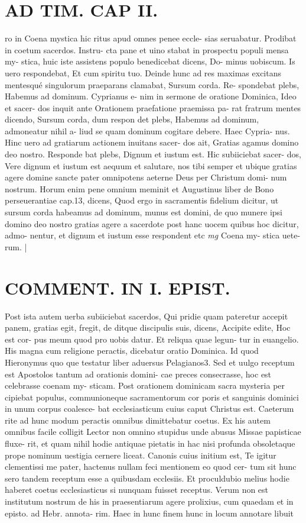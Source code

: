 \documentclass{article}
\begin{document}
\begin{pages}
\section*{AD TIM. CAP II. }
\marginpar{[ p.109 ]}\pstart ro in Coena mystica hic ritus apud omnes penee eccle- sias seruabatur. Prodibat in coetum sacerdos. Instru- cta pane et uino stabat in prospectu populi mensa my- stica, huic iste assistens populo benedicebat dicens, Do- minus uobiscum. Is uero respondebat, Et cum spiritu tuo. Deinde hunc ad res maximas excitans mentesqué singulorum praeparans clamabat, Sursum corda. Re- spondebat plebs, Habemus ad dominum. Cyprianus e- nim in sermone de oratione Dominica, Ideo et sacer- dos inquit ante Orationem praefatione praemissa pa- rat fratrum mentes dicendo, Sursum corda, dum respon det plebs, Habemus ad dominum, admoneatur nihil a- liud se quam dominum cogitare debere. Haec Cypria- nus. Hinc uero ad gratiarum actionem inuitans sacer- dos ait, Gratias agamus domino deo nostro. Responde bat plebs, Dignum et iustum est. Hic subiiciebat sacer- dos, Vere dignum et iustum est aequum et salutare, nos tibi semper et ubique gratias agere domine sancte pater omnipotens aeterne Deus per Christum domi- num nostrum. Horum enim pene omnium meminit et Augustinus liber  de Bono perseuerantiae cap.13, dicens, Quod ergo in sacramentis fidelium dicitur, ut sursum corda habeamus ad dominum, munus est domini, de quo munere ipsi domino deo nostro gratias agere a sacerdote post hanc uocem quibus hoc dicitur, admo- nentur, et dignum et iustum esse respondent etc  \pend
\textit{mg}
\footnotesize Coena my- stica uete- rum. 
\normalsize| 
\section*{COMMENT. IN I. EPIST. }\pstart Post ista autem uerba subiiciebat sacerdos, Qui pridie quam pateretur accepit panem, gratias egit, fregit, de ditque discipulis suis, dicens, Accipite edite, Hoc est cor- pus meum quod pro uobis datur. Et reliqua quae legun- tur in euangelio. His magna cum religione peractis, dicebatur oratio Dominica. Id quod Hieronymus quo que testatur liber  aduersus Pelagianos3. Sed et uulgo receptum est Apostolos tantum ad orationis domini- cae preces consecrasse, hoc est celebrasse coenam my- sticam. Post orationem dominicam sacra mysteria per cipiebat populus, communioneque sacramentorum cor poris et sanguinis dominici in unum corpus coalesce- bat ecclesiasticum cuius caput Christus est. Caeterum rite ad hunc modum peractis omnibus dimittebatur coetus. Ex his autem omnibus facile colligit Lector non omnino stupidus unde abusus Missae papisticae fluxe- rit, et quam nihil hodie antiquae pietatis in hac nisi profunda obsoletaque prope nominum uestigia cernere liceat. Canonis cuius initium est, Te igitur clementissi me pater, hactenus nullam feci mentionem eo quod cer- tum sit hunc sero tandem receptum esse a quibusdam ecclesiis. Et proculdubio melius hodie haberet coetus ecclesiasticus si nunquam fuisset receptus. Verum non est institutum nostrum de his in praesentiarum agere prolixius, cum quaedam et in episto. ad Hebr. annota- rim. Haec in hunc finem hunc in locum annotare libuit  \pend

\end{pages}
\end{document}
